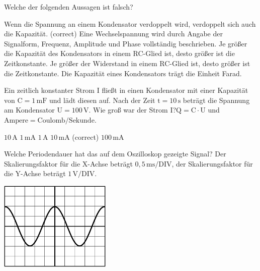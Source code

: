 \documentclass[11pt]{exam}
\begin{document}
\setlength{\voffset}{-0.5in}
\setlength{\headsep}{5pt}

\hspace{2mm}
 \hspace{5mm}
\vspace{4mm}

\begin{questions}

\question Welche der folgenden Aussagen ist falsch?

\begin{choices}
	\choice Wenn die Spannung an einem Kondensator verdoppelt wird, verdoppelt sich auch die Kapazität. (correct)
	\choice Eine Wechselspannung wird durch Angabe der Signalform, Frequenz, Amplitude und Phase vollständig beschrieben.
	\choice Je größer die Kapazität des Kondensators in einem RC-Glied ist, desto größer ist die Zeitkonstante.
	\choice Je größer der Widerstand in einem RC-Glied ist, desto größer ist die Zeitkonstante.
	\choice Die Kapazität eines Kondensators trägt die Einheit Farad.
\end{choices}

\vspace{3mm}\question Ein zeitlich konstanter Strom \(\mathrm{I}\) fließt in einen Kondensator mit einer Kapazität von \(\mathrm{C=1\,mF}\) und lädt diesen auf. Nach der Zeit \(\mathrm{t=10\,s}\) beträgt die Spannung am Kondensator \(\mathrm{U=100\,V}\). Wie groß war der Strom \(\mathrm{I}\)?\(\mathrm{Q=C \cdot U}\) und \(\mathrm{Ampere=Coulomb/Sekunde}\).

\begin{choices}
	\choice \(\mathrm{10\,A}\)
	\choice \(\mathrm{1\,mA}\)
	\choice \(\mathrm{1\,A}\)
	\choice \(\mathrm{10\,mA}\) (correct)
	\choice \(\mathrm{100\,mA}\)
\end{choices}

\vspace{3mm}\question Welche Periodendauer hat das auf dem Oszilloskop gezeigte Signal? Der Skalierungsfaktor für die X-Achse beträgt \(\mathrm{0,5\,ms/DIV}\), der Skalierungsfaktor für die Y-Achse beträgt \(\mathrm{1\,V/DIV}\). 

\includegraphics[width=0.4\textwidth]{images/Oszi2.png}


\end{questions}
\end{document}
